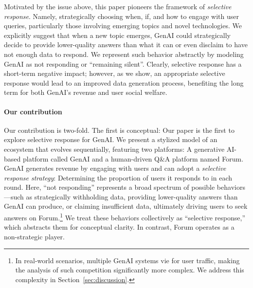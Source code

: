 Motivated by the issue above, this paper pioneers the framework of \emph{selective response}. Namely, strategically choosing when, if, and how to engage with user queries, particularly those involving emerging topics and novel technologies. We explicitly suggest that when a new topic emerges, GenAI could strategically decide to provide lower-quality answers than what it can or even disclaim to have not enough data to respond. We represent such behavior abstractly by modeling GenAI as not responding or ``remaining silent''. Clearly, selective response has a short-term negative impact; however, as we show, an appropriate selective response would lead to an improved data generation process, benefiting the long term for both GenAI's revenue and user social welfare.

\paragraph{Our contribution} 

Our contribution is two-fold. The first is conceptual: Our paper is the first to explore selective response for GenAI. We present a stylized model of an ecosystem that evolves sequentially, featuring two platforms: A generative AI-based platform called GenAI and a human-driven Q\&A platform named Forum. GenAI generates revenue by engaging with users and can adopt a \emph{selective response strategy}: Determining the proportion of users it responds to in each round. Here, ``not responding'' represents a broad spectrum of possible behaviors—such as strategically withholding data, providing lower-quality answers than GenAI can produce, or claiming insufficient data, ultimately driving users to seek answers on Forum.\footnote{In real-world scenarios, multiple GenAI systems vie for user traffic, making the analysis of such competition significantly more complex. We address this complexity in Section~\ref{sec:discussion}.} We treat these behaviors collectively as ``selective response,'' which abstracts them for conceptual clarity. In contrast, Forum operates as a non-strategic player. 

